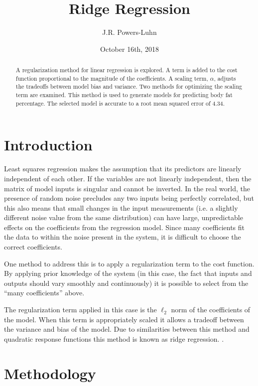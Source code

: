 \documentclass{IEEEtran}
\author{J.R. Powers-Luhn}
\title{Ridge Regression}
\date{October 16th, 2018}
\begin{document}
\maketitle

\begin{abstract}

A regularization method for linear regression is explored. A term is added to the cost function proportional 
to the magnitude of the coefficients. A scaling term, $\alpha$, adjusts the tradeoffs between model bias and 
variance. Two methods for optimizing the scaling term are examined. This method is used to generate models 
for predicting body fat percentage. The selected model is accurate to a root mean squared error of \num{4.34}.

\end{abstract}

\section{Introduction}

Least squares regression makes the assumption that its predictors are linearly independent of each other. 
If the variables are not linearly independent, then the matrix of model inputs is singular and cannot be 
inverted. In the real world, the presence of random noise precludes any two inputs being perfectly correlated, 
but this also means that small changes in the input measurements (i.e. a slightly different noise value from 
the same distribution) can have large, unpredictable effects on the coefficients from the regression model. 
Since many coefficients fit the data to within the noise present in the system, it is difficult to choose the 
correct coefficients.

One method to address this is to apply a regularization term to the cost function. By applying prior knowledge 
of the system (in this case, the fact that inputs and outputs should vary smoothly and continuously) it is 
possible to select from the ``many coefficients'' above. 

The regularization term applied in this case is the $\ell_2$ norm of the coefficients of the model. When this 
term is appropriately scaled it allows a tradeoff between the variance and bias of the model. Due to similarities 
between this method and quadratic response functions this method is known as ridge regression. \cite{hoerl1970ridge}.

\section{Methodology}
\end{document}
